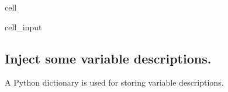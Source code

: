 \documentclass[letterpaper,10pt,english]{jupyterBook}
\begin{document}
\begin{sphinxuseclass}{cell}\begin{sphinxVerbatimInput}

\begin{sphinxuseclass}{cell_input}
\begin{sphinxVerbatim}[commandchars=\\\{\}]
  
\end{sphinxVerbatim}

\end{sphinxuseclass}\end{sphinxVerbatimInput}

\end{sphinxuseclass}

\subsection{Inject some variable descriptions.}
\label{\detokenize{content/howto/smallmodel/modelstart:inject-some-variable-descriptions}}
\sphinxAtStartPar
A Python dictionary is used for storing variable descriptions.
\end{document}

